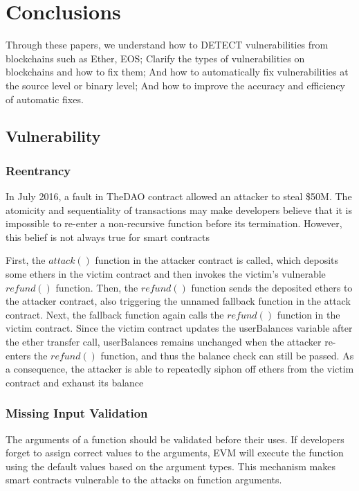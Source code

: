 \documentclass[a4paper, 10pt, conference, twocolumn]{ieeeconf}       %
\begin{document}
\section{Conclusions}

Through these papers, we understand how to DETECT vulnerabilities from blockchains such as Ether, EOS;
Clarify the types of vulnerabilities on blockchains and how to fix them;
And how to automatically fix vulnerabilities at the source level or binary level;
And how to improve the accuracy and efficiency of automatic fixes.

\subsection{Vulnerability}

\subsubsection{Reentrancy}

In July 2016, a fault in TheDAO contract allowed an attacker to steal \$50M.
The atomicity and sequentiality of transactions may make developers believe that it is impossible to re-enter a non-recursive function before its termination. However, this belief is not always true for smart contracts

First, the $attack()$ function in the attacker contract is called, which deposits some ethers in the victim contract and then invokes the victim’s vulnerable $refund()$ function.
Then, the $refund()$ function sends the deposited ethers to the attacker contract, also triggering the unnamed fallback function in the attack contract.
Next, the fallback function again calls the $refund()$ function in the victim contract.
Since the victim contract updates the userBalances variable after the ether transfer call, userBalances remains unchanged when the attacker re-enters the $refund()$ function, and thus the balance check can still be passed.
As a consequence, the attacker is able to repeatedly siphon off ethers from the victim contract and exhaust its balance

\subsubsection{Missing Input Validation}
The arguments of a function should be validated before their uses. 
If developers forget to assign correct values to the arguments, EVM will execute the function using the default values based on the argument types.
This mechanism makes smart contracts vulnerable to the attacks on function arguments.
\end{document}

